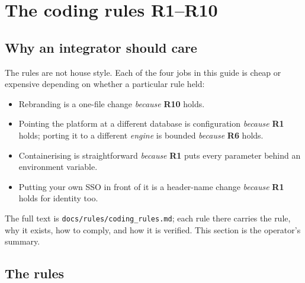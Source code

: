 \documentclass[11pt]{article}
\newcommand{\rulename}[1]{\textbf{#1}}
\begin{document}
\clearpage
\section{The coding rules R1--R10}
\label{sec:rules}

\subsection{Why an integrator should care}

The rules are not house style. Each of the four jobs in this guide is cheap or expensive
depending on whether a particular rule held:

\begin{itemize}
  \item Rebranding is a one-file change \emph{because} \rulename{R10} holds.
  \item Pointing the platform at a different database is configuration \emph{because}
        \rulename{R1} holds; porting it to a different \emph{engine} is bounded \emph{because}
        \rulename{R6} holds.
  \item Containerising is straightforward \emph{because} \rulename{R1} puts every parameter
        behind an environment variable.
  \item Putting your own SSO in front of it is a header-name change \emph{because}
        \rulename{R1} holds for identity too.
\end{itemize}

The full text is \texttt{docs/rules/coding\_rules.md}; each rule there carries the rule,
why it exists, how to comply, and how it is verified. This section is the operator's
summary.

\subsection{The rules}
\end{document}
